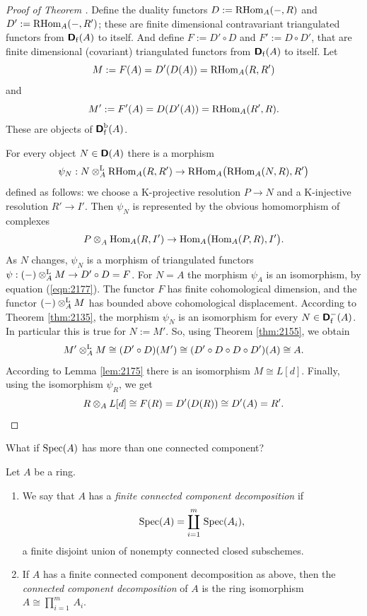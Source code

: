 \begin{proof}[Proof of Theorem \tup{\ref{thm:2175}}]
Define the duality functors
$D := \operatorname{RHom}_{A}(-, R)$ and \lb $D' := \operatorname{RHom}_{A}(-, R')$; these are 
finite 
dimensional contravariant triangulated functors from $\boldsymbol{\mathsf{D}}_{\mathrm{f}}(A)$ to 
itself. And define $F := D' \circ D$ and $F' := D \circ D'$, that are finite 
dimensional (covariant) triangulated functors from $\boldsymbol{\mathsf{D}}_{\mathrm{f}}(A)$ to 
itself. Let
\begin{equation} \label{eqn:2177}
M := F(A) = D'(D(A)) = \operatorname{RHom}_{A}(R, R')
\end{equation}
and
\[ M' := F'(A) = D(D'(A)) = \operatorname{RHom}_{A}(R', R) . \]
These are objects of $\boldsymbol{\mathsf{D}}^{\mathrm{b}}_{\mathrm{f}}(A)$. 

For every object $N \in \boldsymbol{\mathsf{D}}(A)$ there is a morphism 
\[ \psi_N : N \otimes^{\mathrm{L}}_A \operatorname{RHom}_{A}(R, R') \to 
\operatorname{RHom}_{A} \bigl( \operatorname{RHom}_{A} (N, R) , R' \bigr) \]
defined as follows: we choose a K-projective resolution $P \to N$
and a K-injective resolution $R' \to I'$. Then $\psi_N$ is represented by the 
obvious homomorphism of complexes 
\[ P \otimes^{}_A \operatorname{Hom}_{A}(R, I') \to 
\operatorname{Hom}_{A} \bigl( \operatorname{Hom}_{A} (P, R) , I' \bigr) . \]
As $N$ changes, $\psi_N$ is a morphism of triangulated functors
$\psi : (-) \otimes^{\mathrm{L}}_A M \to D' \circ D  = F$.
For $N = A$ the morphism $\psi_A$ is an isomorphism, by equation 
(\ref{eqn:2177}). The functor $F$ has finite cohomological dimension, and the 
functor $(-) \otimes^{\mathrm{L}}_A M$ has bounded above cohomological displacement. 
According to Theorem \ref{thm:2135}, the morphism 
$\psi_N$ is an isomorphism for every $N \in \boldsymbol{\mathsf{D}}^-_{\mathrm{f}}(A)$. 
In particular this is true for $N := M'$. So, using Theorem \ref{thm:2155}, 
we obtain 
\[ M' \otimes^{\mathrm{L}}_A M \cong (D' \circ D)(M') \cong 
(D' \circ D \circ D \circ D')(A) \cong A . \]
According to Lemma \ref{lem:2175} there is an isomorphism 
$M \cong L[d]$. Finally, using the isomorphism $\psi_R$, we get 
\[ R \otimes_A L[d] \cong F(R) = D'(D(R)) \cong D'(A) = R' . \qedhere \]
\end{proof}

What if $\operatorname{Spec}(A)$ has more than one connected component?

\begin{dfn} \label{dfn:3210}
Let $A$ be a ring. 
\begin{enumerate}
\item We say that $A$ has a {\em finite connected component decomposition}
if 
\[ \operatorname{Spec}(A) = \coprod_{i = 1}^{m} \, \operatorname{Spec}(A_i) , \] 
a finite disjoint union of nonempty connected closed subschemes. 

\item If $A$ has a finite connected component decomposition as above, then 
the 
{\em connected component decomposition}%
of $A$ is the ring isomorphism 
$A \cong \prod_{i = 1}^{m} \, A_i$.
\end{enumerate}
\end{dfn}


